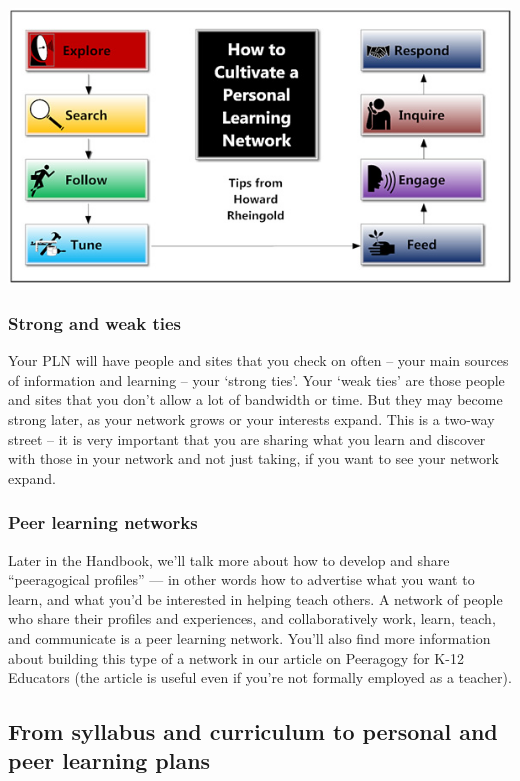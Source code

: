 \begin{center}
\includegraphics[width=.75\textwidth]{../pictures/network.jpg}
\end{center}

\subsubsection{Strong and weak ties}

Your PLN will have people and sites that you check on often -- your main
sources of information and learning -- your `strong ties'. Your `weak
ties' are those people and sites that you don't allow a lot of bandwidth
or time. But they may become strong later, as your network grows or your
interests expand. This is a two-way street -- it is very important that
you are sharing what you learn and discover with those in your network
and not just taking, if you want to see your network expand.

\subsubsection{Peer learning networks}

Later in the Handbook, we'll talk more about how to develop and share
``peeragogical profiles'' --- in other words how to advertise what you
want to learn, and what you'd be interested in helping teach others. A
network of people who share their profiles and experiences, and
collaboratively work, learn, teach, and communicate is a peer learning
network. You'll also find more information about building this type of a
network in our article on Peeragogy for K-12 Educators (the article is
useful even if you're not formally employed as a teacher).

\subsection{From syllabus and curriculum to personal and peer learning
plans}


